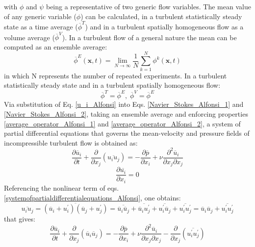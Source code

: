 with $\phi$ and $\psi$ being a representative of two generic flow variables. The mean value of any generic variable ($\phi$) can be calculated, in a turbulent statistically steady state as a time average ($\overline{\phi}^T$) and in a turbulent spatially homogeneous flow as a volume average ($\overline{\phi}^V$). In a turbulent flow of a general nature the mean can be computed as an ensemble average:
\begin{equation}
	\overline{\phi}^E(\textbf{x},t) = \lim_{N \to \infty} \frac{1}{N}\sum\limits_{k=1}^N \phi^k(\textbf{x},t)
\end{equation}
in which N represents the number of repeated experiments. In a turbulent statistically steady state and in a turbulent spatially homogeneous flow:
\begin{equation}
\overline{\phi}^T = \overline{\phi}^E,\;\overline{\phi}^V = \overline{\phi}^E
\end{equation}
Via substitution of Eq. \ref{u_i_Alfonsi} into Eqs. \ref{Navier_Stokes_Alfonsi_1} and \ref{Navier_Stokes_Alfonsi_2}, taking an ensemble average and enforcing properties \ref{average_operator_Alfonsi_1} and \ref{average_operator_Alfonsi_2}, a system of partial differential equations that governs the mean-velocity and pressure fields of incompressible turbulent flow is obtained as:
\begin{equation} \label{systemofpartialdifferentialequations_Alfonsi}
	\frac{\partial \overline{u}_i}{\partial t} + \frac{\partial}{\partial x_j}(\overline{u_i u_j}) = -\frac{\partial\overline{p}}{\partial x_i} + \nu\frac{\partial^2 \overline{u}_i}{\partial x_j \partial x_j}
\end{equation}
\begin{equation}
	\frac{\partial\overline{u_i}}{\partial x_i} = 0
\end{equation}
Referencing the nonlinear term of eqs. \ref{systemofpartialdifferentialequations_Alfonsi}, one obtains:
\begin{equation}
	\overline{u_i u_j} =
	 \overline{(\overline{u}_i + u_i^\prime)(\overline{u}_j + u_j^\prime)} =
	  \overline{\overline{u}_i\overline{u}_j} + 
	  \overline{\overline{u}_i u_j^\prime} +
	   \overline{{u}_i^\prime\overline{u}_j} + 
		\overline{u_i^\prime u_j^\prime} =
		\overline{u}_i \overline{u}_j +
		\overline{u_i^\prime u_j^\prime}
\end{equation}
that gives:
\begin{equation}
	\frac{\partial\overline{u}_i}{\partial t} + \frac{\partial}{\partial x_j}(\overline{u}_i\overline{u}_j) = - \frac{\partial\overline{p}}{\partial x_i} + \nu\frac{\partial^2\overline{u}_i}{\partial x_j \partial x_j} - \frac{\partial}{\partial x_j} (\overline{u_i^\prime u_j^\prime})
\end{equation}

